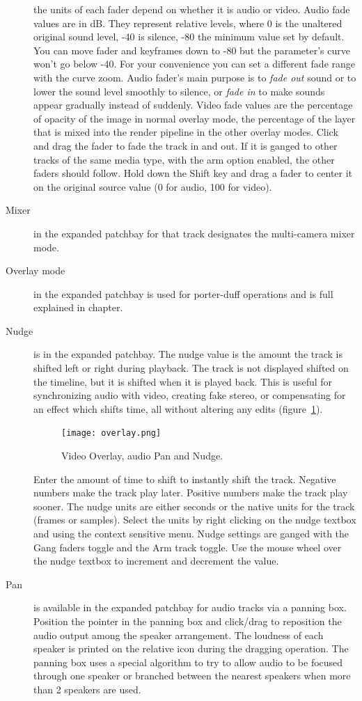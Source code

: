 \begin{description}
  the units of each fader depend on whether it is audio or video.
  Audio fade values are in dB. They represent relative levels, where 0
  is the unaltered original sound level, -40 is silence, -80 the
  minimum value set by default.  You can move fader and keyframes down
  to -80 but the parameter's curve won't go below -40.  For your
  convenience you can set a different fade range with the curve zoom.
  Audio fader’s main purpose is to \textit{fade out} sound or to lower
  the sound level smoothly to silence, or \textit{fade in} to make
  sounds appear gradually instead of suddenly.  Video fade values are
  the percentage of opacity of the image in normal overlay mode, the
  percentage of the layer that is mixed into the render pipeline in
  the other overlay modes.  Click and drag the fader to fade the track
  in and out.  If it is ganged to other tracks of the same media type,
  with the arm option enabled, the other faders should follow.  Hold
  down the Shift key and drag a fader to center it on the original
  source value (0 for audio, 100 for video).
\item[Mixer] in the expanded patchbay for that track designates
  the multi-camera mixer mode.
\item[Overlay mode] in the expanded patchbay is used for
  porter-duff operations and is full explained in
   chapter.
\item[Nudge] is in the expanded patchbay.  The nudge value is
  the amount the track is shifted left or right during playback. The
  track is not displayed shifted on the timeline, but it is shifted
  when it is played back. This is useful for synchronizing audio with
  video, creating fake stereo, or compensating for an effect which
  shifts time, all without altering any edits
  (figure~\ref{fig:overlay}).

  \begin{figure}[htpb] \centering
    \texttt{[image: overlay.png]}
    \caption{Video Overlay, audio Pan and Nudge.}
    \label{fig:overlay}
  \end{figure}

  Enter the amount of time to shift to instantly shift the
  track. Negative numbers make the track play later. Positive numbers
  make the track play sooner. The nudge units are either seconds or
  the native units for the track (frames or samples). Select the units
  by right clicking on the nudge textbox and using the context
  sensitive menu. Nudge settings are ganged with the Gang faders
  toggle and the Arm track toggle. Use the mouse wheel over the nudge
  textbox to increment and decrement the value.
\item[Pan] is available in the expanded patchbay for audio
  tracks via a panning box. Position the pointer in the panning box
  and click/drag to reposition the audio output among the speaker
  arrangement. The loudness of each speaker is printed on the relative
  icon during the dragging operation. The panning box uses a special
  algorithm to try to allow audio to be focused through one speaker or
  branched between the nearest speakers when more than 2 speakers are
  used.
\end{description}

